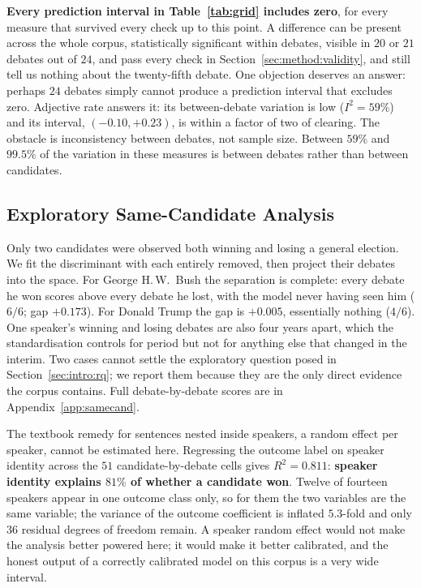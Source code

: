\documentclass[journal]{IEEEtran}
\begin{document}
\textbf{Every prediction interval in Table~\ref{tab:grid} includes zero},
for every measure that survived every check up to this point. A difference
can be present across the whole corpus, statistically significant within
debates, visible in $20$ or $21$ debates out of $24$, and pass every check
in Section~\ref{sec:method:validity}, and still tell us nothing about the
twenty-fifth debate. One objection deserves an answer: perhaps $24$ debates
simply cannot produce a prediction interval that excludes zero. Adjective
rate answers it: its between-debate variation is low ($I^2 = 59\%$) and its
interval, $(-0.10, +0.23)$, is within a factor of two of clearing. The
obstacle is inconsistency between debates, not sample size. Between $59\%$
and $99.5\%$ of the variation in these measures is between debates rather
than between candidates.

\subsection{Exploratory Same-Candidate Analysis}
\label{sec:method:samecand}

Only two candidates were observed both winning and losing a general
election. We fit the discriminant with each entirely removed, then project
their debates into the space. For George H.\,W.\ Bush the separation is
complete: every debate he won scores above every debate he lost, with the
model never having seen him ($6/6$; gap $+0.173$). For Donald Trump the gap
is $+0.005$, essentially nothing ($4/6$). One speaker's winning and losing
debates are also four years apart, which the standardisation controls for
period but not for anything else that changed in the interim. Two cases
cannot settle the exploratory question posed in Section~\ref{sec:intro:rq};
we report them because they are the only direct evidence the corpus
contains. Full debate-by-debate scores are in Appendix~\ref{app:samecand}.

The textbook remedy for sentences nested inside speakers, a random effect
per speaker, cannot be estimated here. Regressing the outcome label on
speaker identity across the $51$ candidate-by-debate cells gives
$R^2 = 0.811$: \textbf{speaker identity explains $81\%$ of whether a
candidate won}. Twelve of fourteen speakers appear in one outcome class
only, so for them the two variables are the same variable; the variance of
the outcome coefficient is inflated $5.3$-fold and only $36$ residual
degrees of freedom remain. A speaker random effect would not make the
analysis better powered here; it would make it better calibrated, and the
honest output of a correctly calibrated model on this corpus is a very wide
interval.
\end{document}
